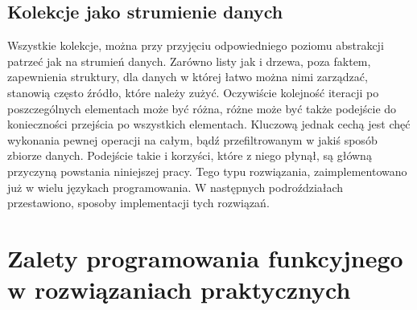 \documentclass[a4paper,10pt]{report}
\begin{document}
\section{Kolekcje jako strumienie danych}
Wszystkie kolekcje, można przy przyjęciu odpowiedniego poziomu abstrakcji patrzeć jak na strumień danych. Zarówno listy jak i drzewa, poza faktem, zapewnienia struktury, dla danych w której łatwo można nimi zarządzać, stanowią często źródło, które należy zużyć. Oczywiście kolejność iteracji po poszczególnych elementach może być różna, różne może być także podejście do konieczności przejścia po wszystkich elementach. Kluczową jednak cechą jest chęć wykonania pewnej operacji na całym, bądź przefiltrowanym w jakiś sposób zbiorze danych. Podejście takie i korzyści, które z niego płynął, są główną przyczyną powstania niniejszej pracy. Tego typu rozwiązania, zaimplementowano już w wielu językach programowania. W następnych podroździałach przestawiono, sposoby implementacji tych rozwiązań.
\chapter{Zalety programowania funkcyjnego w rozwiązaniach praktycznych}
\end{document}

